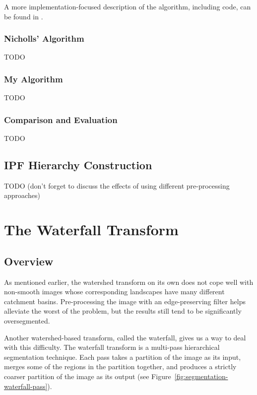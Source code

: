 \noindent A more implementation-focused description of the algorithm, including code, can be found in \cite{golodetz08}.

\subsubsection{Nicholls' Algorithm}

TODO

\subsubsection{My Algorithm}
\label{subsubsec:segmentation-waterfall-myalgorithm}

TODO

\subsubsection{Comparison and Evaluation}

TODO

\subsection{IPF Hierarchy Construction}

TODO (don't forget to discuss the effects of using different pre-processing approaches)

\iffalse

\section{The Waterfall Transform}

\subsection{Overview}

As mentioned earlier, the watershed transform on its own does not cope well with non-smooth images whose corresponding landscapes have many different catchment basins. Pre-processing the image with an edge-preserving filter helps alleviate the worst of the problem, but the results still tend to be significantly oversegmented.

Another watershed-based transform, called the waterfall, gives us a way to deal with this difficulty. The waterfall transform is a multi-pass hierarchical segmentation technique. Each pass takes a partition of the image as its input, merges some of the regions in the partition together, and produces a strictly coarser partition of the image as its output (see Figure~\ref{fig:segmentation-waterfall-pass}).

